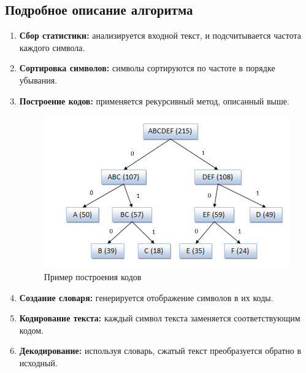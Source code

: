 \documentclass[12pt]{article}
\begin{document}
\captionsetup[figure]{labelfont=bf, labelsep=endash}

\subsection{Подробное описание алгоритма}
\begin{enumerate}
    \item \textbf{Сбор статистики:} анализируется входной текст, и подсчитывается частота каждого символа.
    \item \textbf{Сортировка символов:} символы сортируются по частоте в порядке убывания.
    \item \textbf{Построение кодов:} применяется рекурсивный метод, описанный выше.
        \begin{figure}[H]
        \centering
            \includegraphics[scale=0.5]{temp.png}
            \caption{Пример построения кодов}
        \end{figure}
         
    \item \textbf{Создание словаря:} генерируется отображение символов в их коды.
    \item \textbf{Кодирование текста:} каждый символ текста заменяется соответствующим кодом.
    \item \textbf{Декодирование:} используя словарь, сжатый текст преобразуется обратно в исходный.
\end{enumerate}
\end{document}
